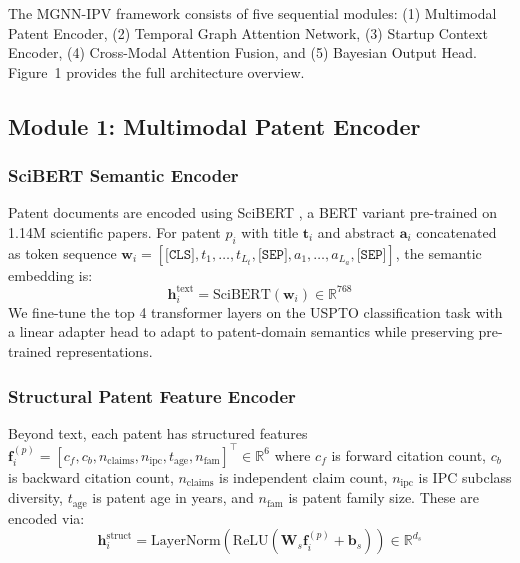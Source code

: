 \documentclass[journal]{IEEEtran}
\begin{document}
The MGNN-IPV framework consists of five sequential modules: (1) Multimodal Patent Encoder, (2) Temporal Graph Attention Network, (3) Startup Context Encoder, (4) Cross-Modal Attention Fusion, and (5) Bayesian Output Head. Figure~1 provides the full architecture overview.

\subsection{Module 1: Multimodal Patent Encoder}

\subsubsection{SciBERT Semantic Encoder}

Patent documents are encoded using SciBERT \cite{beltagy2019scibert}, a BERT variant pre-trained on 1.14M scientific papers. For patent $p_i$ with title $\mathbf{t}_i$ and abstract $\mathbf{a}_i$ concatenated as token sequence $\mathbf{w}_i = [\texttt{[CLS]}, t_1, \ldots, t_{L_t}, \texttt{[SEP]}, a_1, \ldots, a_{L_a}, \texttt{[SEP]}]$, the semantic embedding is:
\begin{equation}
    \mathbf{h}_i^{\text{text}} = \text{SciBERT}(\mathbf{w}_i) \in \mathbb{R}^{768}
    \label{eq:scibert}
\end{equation}
We fine-tune the top 4 transformer layers on the USPTO classification task with a linear adapter head to adapt to patent-domain semantics while preserving pre-trained representations.

\subsubsection{Structural Patent Feature Encoder}

Beyond text, each patent has structured features $\mathbf{f}_i^{(p)} = [c_f, c_b, n_{\text{claims}}, n_{\text{ipc}}, t_{\text{age}}, n_{\text{fam}}]^\top \in \mathbb{R}^6$ where $c_f$ is forward citation count, $c_b$ is backward citation count, $n_{\text{claims}}$ is independent claim count, $n_{\text{ipc}}$ is IPC subclass diversity, $t_{\text{age}}$ is patent age in years, and $n_{\text{fam}}$ is patent family size. These are encoded via:
\begin{equation}
    \mathbf{h}_i^{\text{struct}} = \text{LayerNorm}(\text{ReLU}(\mathbf{W}_s \mathbf{f}_i^{(p)} + \mathbf{b}_s)) \in \mathbb{R}^{d_s}
    \label{eq:struct_enc}
\end{equation}
\end{document}
